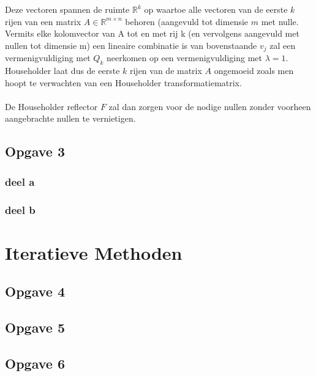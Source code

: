 \documentclass[een]{practicumverslag}
\begin{document}
Deze vectoren spannen de ruimte $\mathbb{R}^k$ op waartoe alle vectoren
van de eerste $k$ rijen van een matrix $A \in \mathbb{R}^{m \times n}$ behoren (aangevuld tot dimensie $m$ met nulle. 
Vermits elke kolomvector van A tot en met rij k (en vervolgens aangevuld met nullen tot dimensie m) een lineaire combinatie is van bovenstaande $v_j$ zal een vermenigvuldiging met $Q_k$ neerkomen op een vermenigvuldiging met $\lambda = 1$. Householder laat dus de eerste $k$ rijen van de matrix $A$ ongemoeid zoals men hoopt te verwachten van een Householder transformatiematrix.\\
\\
De Householder reflector $F$ zal dan zorgen voor de nodige nullen zonder voorheen aangebrachte nullen te vernietigen.

\pagebreak
\subsection*{Opgave 3}

\subsubsection{deel a}

\lipsum[8-8]

\subsubsection{deel b}

\lipsum[9-9]

\section{Iteratieve Methoden}

\subsection*{Opgave 4}

\lipsum[3-3]

\subsection*{Opgave 5}

\lipsum[7-7]

\subsection*{Opgave 6}
\end{document}
